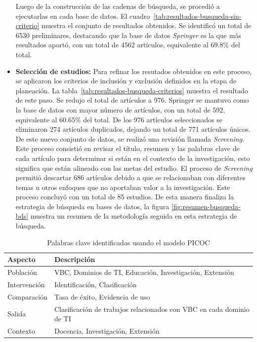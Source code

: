 \begin{itemize}
    Luego de la construcción de las cadenas de búsqueda, se procedió a ejecutarlas en cada base de datos. El cuadro~\ref{tab:resultados-busqueda-sin-criterio} muestra el conjunto de resultados obtenidos. Se identificó un total de 6530 preliminares, destacando que la base de datos \textit{Springer} es la que más resultados aportó, con un total de 4562 artículos, equivalente al 69.8\% del total.\\

    \item \textbf{Selección de estudios: } Para refinar los resutados obtenidos en este proceso, se aplicaron los criterios de inclusión y exclusión definidos en la etapa de planeación. La tabla~\ref{tab:resultados-busqueda-criterios} muestra el resultado de este paso. Se redujo el total de artículos a 976. Springer se mantuvo como la base de datos con mayor número de artículos, con un total de 592, equivalente al 60.65\% del total. De los 976 artículos seleccionados se eliminaron 274 artículos duplicados, dejando un total de 771 artículos únicos. De este nuevo conjunto de datos, se realizó una revisión llamada \textit{Screening}. Este proceso consistió en revisar el título, resumen y las palabras clave de cada artículo para determinar si están en el contexto de la investigación, esto significa que están alineado con las metas del estudio. 
    El proceso de \textit{Screening} permitió descartar 686 artículos debido a que se relacionaban con diferentes temas u otros enfoques que no aportaban valor a la investigación. Este proceso concluyó con un total de 85 estudios.
    De esta manera finaliza la estrategia de búsqueda en bases de datos, la figura \ref{fig:resumen-busqueda-bds} muestra un resumen de la metodología seguida en esta estrategia de búsqueda.\\
\end{itemize}

\begin{table}[tbp]
    \scriptsize %
    \centering
    \renewcommand{\arraystretch}{1.3}
    \begin{tabularx}{\columnwidth}{>{\centering\arraybackslash}m{} >{\RaggedRight\arraybackslash}X}
        \hline
        \textbf{Aspecto} & \textbf{Descripción} \\
        \hline
        Población & VBC, Dominios de TI, Educación, Investigación, Extensión \\
        Intervención & Identificación, Clasificación \\
        Comparación & Tasa de éxito, Evidencia de uso \\
        Salida & Clasificación de trabajos relacionados con VBC en cada dominio de TI \\
        Contexto & Docencia, Investigación, Extensión \\
        \hline
    \end{tabularx}
    \caption{Palabras clave identificadas usando el modelo PICOC}\label{tab:palabras-clave}
\end{table}

